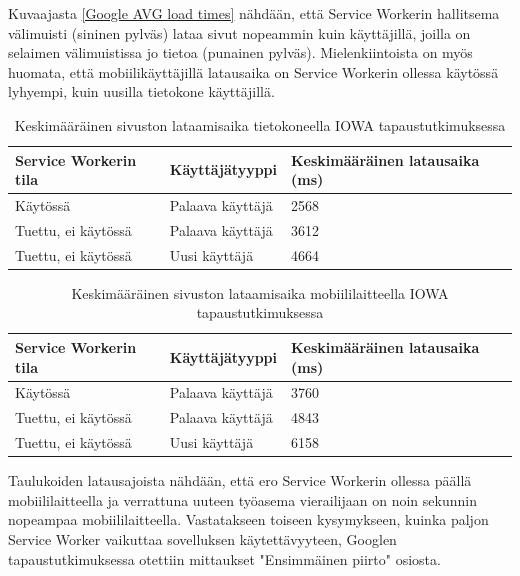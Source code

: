 \documentclass{tktltiki}
\begin{document}
Kuvaajasta \ref{Google AVG load times} nähdään, että Service Workerin hallitsema välimuisti (sininen pylväs) lataa sivut nopeammin kuin käyttäjillä, joilla on selaimen välimuistissa jo tietoa (punainen pylväs). Mielenkiintoista on myös huomata, että mobiilikäyttäjillä latausaika on Service Workerin ollessa käytössä lyhyempi, kuin uusilla tietokone käyttäjillä. 

\begin{table}[h]
\centering
\begin{small}
\caption{Keskimääräinen sivuston lataamisaika tietokoneella IOWA tapaustutkimuksessa \cite{Walton} }
\begin{tabular}{|L{5cm}|L{5cm}|L{5cm}|}
\hline
\textbf{Service Workerin tila} & 
\textbf{Käyttäjätyyppi} &
\textbf{Keskimääräinen latausaika (ms)}
\\ \hline
Käytössä & 
Palaava käyttäjä &
2568
\\ \hline
Tuettu, ei käytössä & 
Palaava käyttäjä &
3612
\\ \hline
Tuettu, ei käytössä & 
Uusi käyttäjä &
4664
\\ \hline
\end{tabular}
\label{table:loading time on pc}
\end{small}
\end{table}

\clearpage

\begin{table}[h]
\centering
\begin{small}
\caption{Keskimääräinen sivuston lataamisaika mobiililaitteella IOWA tapaustutkimuksessa \cite{Walton} }
\begin{tabular}{|L{5cm}|L{5cm}|L{5cm}|}
\hline
\textbf{Service Workerin tila} & 
\textbf{Käyttäjätyyppi} &
\textbf{Keskimääräinen latausaika (ms)}
\\ \hline
Käytössä & 
Palaava käyttäjä &
3760
\\ \hline
Tuettu, ei käytössä & 
Palaava käyttäjä &
4843
\\ \hline
Tuettu, ei käytössä & 
Uusi käyttäjä &
6158
\\ \hline
\end{tabular}
\label{table:loading time on mobile}
\end{small}
\end{table}


Taulukoiden latausajoista nähdään, että ero Service Workerin ollessa päällä mobiililaitteella ja verrattuna uuteen työasema vierailijaan on noin sekunnin nopeampaa mobiililaitteella. Vastatakseen toiseen kysymykseen, kuinka paljon Service Worker vaikuttaa sovelluksen käytettävyyteen, Googlen tapaustutkimuksessa otettiin mittaukset "Ensimmäinen piirto" osiosta.
\end{document}
